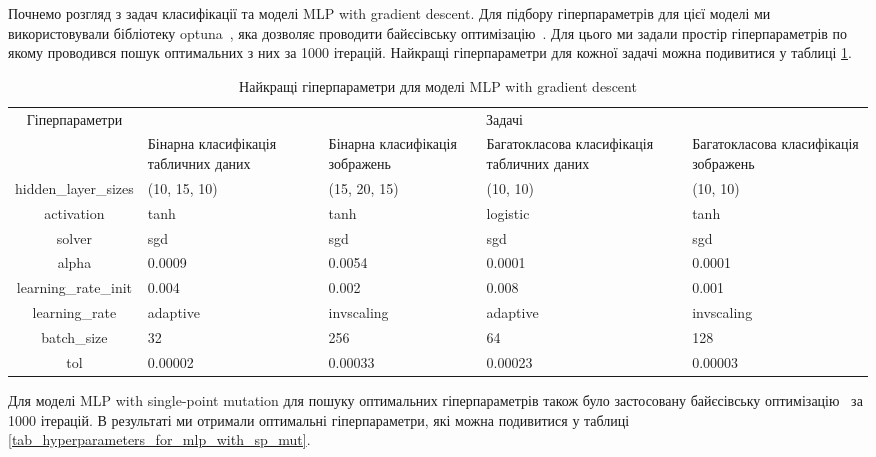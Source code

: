 Почнемо розгляд з задач класифікації та моделі MLP with gradient descent. Для підбору гіперпараметрів для цієї моделі ми використовували бібліотеку optuna~\cite{ct22}, яка дозволяє проводити байєсівську оптимізацію~\cite{ct37}. Для цього ми задали простір гіперпараметрів по якому проводився пошук оптимальних з них за 1000 ітерацій. Найкращі гіперпараметри для кожної задачі можна подивитися у таблиці \ref{tab_hyperparameters_for_mlp_with_gd}.

\begin{table}[ht]
	\centering
	\begin{adjustbox}{max width=\textwidth}
		\begin{tabular}{|c|p{3cm}|p{3cm}|p{3cm}|p{3cm}|}
			\hline \multirow{2}{*}{Гіперпараметри} & \multicolumn{4}{c|}{Задачі} \\
			\cline{2-5} & Бінарна класифікація табличних даних & Бінарна класифікація зображень & Багатокласова класифікація табличних даних & Багатокласова класифікація зображень \\
			\hline hidden\_layer\_sizes & (10, 15, 10) & (15, 20, 15) & (10, 10) & (10, 10) \\
			\hline activation & tanh & tanh & logistic & tanh \\
			\hline solver & sgd & sgd & sgd & sgd \\
			\hline alpha & 0.0009 & 0.0054 & 0.0001 & 0.0001 \\
			\hline learning\_rate\_init & 0.004 & 0.002 & 0.008 & 0.001 \\
			\hline learning\_rate & adaptive & invscaling & adaptive & invscaling \\
			\hline batch\_size & 32 & 256 & 64 & 128 \\
			\hline tol & 0.00002 & 0.00033 & 0.00023 & 0.00003 \\
			\hline
		\end{tabular}
	\end{adjustbox}
	\caption{Найкращі гіперпараметри для моделі MLP with gradient descent}
	\label{tab_hyperparameters_for_mlp_with_gd}
\end{table}

Для моделі MLP with single-point mutation для пошуку оптимальних гіперпараметрів також було застосовану байєсівську оптимізацію~\cite{ct37} за 1000 ітерацій. В результаті ми отримали оптимальні гіперпараметри, які можна подивитися у таблиці \ref{tab_hyperparameters_for_mlp_with_sp_mut}.

